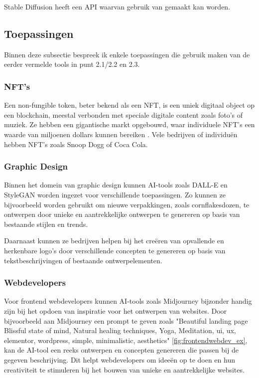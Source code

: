 Stable Diffusion heeft een API waarvan gebruik van gemaakt kan worden. \\

\pagebreak

\subsection{Toepassingen}
Binnen deze subsectie bespreek ik enkele toepassingen die gebruik maken van de eerder vermelde tools in punt 2.1/2.2 en 2.3.

\subsubsection{NFT's}
Een non-fungible token, beter bekend als een NFT, is een uniek digitaal object op een blockchain, meestal verbonden met speciale digitale content zoals foto's of muziek. Ze hebben een gigantische markt opgebouwd, waar individuele NFT's een waarde van miljoenen dollars kunnen bereiken \autocite{nft_whatisit}. Vele bedrijven of individuën hebben NFT's zoals Snoop Dogg of Coca Cola.

\subsubsection{Graphic Design}
Binnen het domein van graphic design kunnen AI-tools zoals DALL-E en StyleGAN worden ingezet voor verschillende toepassingen. Zo kunnen ze bijvoorbeeld worden gebruikt om nieuwe verpakkingen, zoals cornflakesdozen, te ontwerpen door unieke en aantrekkelijke ontwerpen te genereren op basis van bestaande stijlen en trends. 

Daarnaast kunnen ze bedrijven helpen bij het creëren van opvallende en herkenbare logo's door verschillende concepten te genereren op basis van tekstbeschrijvingen of bestaande ontwerpelementen. 

\subsubsection{Webdevelopers}
Voor frontend webdevelopers kunnen AI-tools zoals Midjourney bijzonder handig zijn bij het opdoen van inspiratie voor het ontwerpen van websites. Door bijvoorbeeld aan Midjourney een prompt te geven zoals "Beautiful landing page Blissful state of mind, Natural healing techniques, Yoga, Meditation, ui, ux, elementor, wordpress, simple, minimalistic, aesthetics" \ref{fig:frontendwebdev_ex}, kan de AI-tool een reeks ontwerpen en concepten genereren die passen bij de gegeven beschrijving. Dit helpt webdevelopers om ideeën op te doen en hun creativiteit te stimuleren bij het bouwen van unieke en aantrekkelijke websites.

